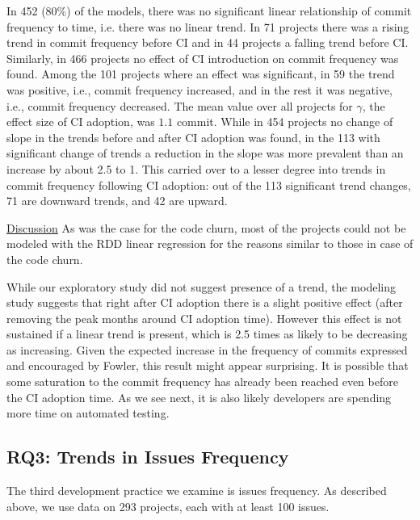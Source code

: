 In 452 (80\%) of the models, there was no significant linear relationship of commit frequency to time, i.e. there was no linear trend.
In 71 projects there was a rising trend in commit frequency before CI and in 44 projects a falling trend before CI.
Similarly, in 466 projects no effect of CI introduction on commit frequency was found. Among the 101 projects where an effect was significant, in 59 the trend was positive, i.e., commit frequency increased, and in the rest it was negative, i.e., commit frequency decreased.
The mean value over all projects for $\gamma$, the effect size of CI adoption, was $1.1$ commit.
While in 454 projects no change of slope in the trends before and after CI adoption was found, in the 113 with significant change of trends a reduction in the slope was more prevalent than an increase by about 2.5 to 1.
This carried over to a lesser degree into trends in commit frequency following CI adoption: out of the 113 significant trend changes, 71 are downward trends, and 42 are upward.

\noindent \underline{Discussion}
As was the case for the code churn, most of the projects could not be modeled with the RDD linear regression for 
the reasons similar to those in case of the code churn.

While our exploratory study did not suggest presence of a trend, the modeling study suggests that right after CI adoption there is a slight positive effect (after removing the peak months around CI adoption time). However this effect is not sustained if a linear 
trend is present, which is 2.5 times as likely to be decreasing as increasing. 
Given the expected increase in the frequency of commits expressed and encouraged by Fowler, this result might appear surprising.
It is possible that some saturation to the commit frequency has already been reached even before the CI adoption time.
As we see next, it is also likely developers are spending more time on automated testing.





\subsection{RQ3: Trends in Issues Frequency}

The third development practice we examine is issues frequency.
As described above, we use data on 293 projects, each with at least 100 issues.

